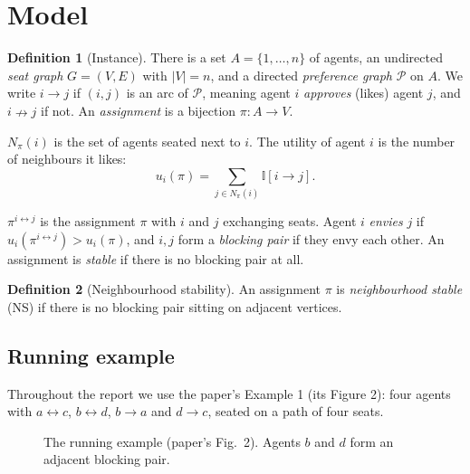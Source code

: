 \documentclass[11pt,a4paper]{article}
\theoremstyle{definition}
\newtheorem{definition}{Definition}
\theoremstyle{remark}
\theoremstyle{plain}
\newcommand{\nlikes}{\nrightarrow}
\newcommand{\cP}{\mathcal{P}}
\newcommand{\figtwopref}{%
  \node[aga] (a) at (0,1.6) {a}; \node[agc] (c) at (2.1,1.6) {c};
  \node[agb] (b) at (0,0) {b};   \node[agd] (d) at (2.1,0) {d};
  \draw[arc] (a) to[bend left=18] (c); \draw[arc] (c) to[bend left=18] (a);
  \draw[arc] (b) to[bend left=18] (d); \draw[arc] (d) to[bend left=18] (b);
  \draw[arc] (b) -- (a); \draw[arc] (d) -- (c);}
\newcommand{\pathseat}[4]{%
  \draw[sedge] (0,0) -- (4.5,0);
  \node[ag#1] (#1) at (0,0) {#1}; \node[ag#2] (#2) at (1.5,0) {#2};
  \node[ag#3] (#3) at (3,0) {#3}; \node[ag#4] (#4) at (4.5,0) {#4};}
\newcommand{\seatlabels}{\foreach \i in {1,...,4}{\node[lab] at ({(\i-1)*1.5},-0.6) {$v_{\i}$};}}
\begin{document}
\section{Model}

\begin{definition}[Instance]
There is a set $A=\{1,\dots,n\}$ of agents, an undirected \emph{seat graph} $G=(V,E)$ with $|V|=n$, and a directed \emph{preference graph} $\cP$ on $A$. We write $i\to j$ if $(i,j)$ is an arc of $\cP$, meaning agent $i$ \emph{approves} (likes) agent $j$, and $i\nlikes j$ if not. An \emph{assignment} is a bijection $\pi:A\to V$.
\end{definition}

$N_\pi(i)$ is the set of agents seated next to $i$. The utility of agent $i$ is the number of neighbours it likes:
\[ u_i(\pi)=\sum_{j\in N_\pi(i)}\mathbb{I}[i\to j]. \]

$\pi^{i\leftrightarrow j}$ is the assignment $\pi$ with $i$ and $j$ exchanging seats. Agent $i$ \emph{envies} $j$ if $u_i(\pi^{i\leftrightarrow j})>u_i(\pi)$, and $i,j$ form a \emph{blocking pair} if they envy each other. An assignment is \emph{stable} if there is no blocking pair at all.

\begin{definition}[Neighbourhood stability]
An assignment $\pi$ is \emph{neighbourhood stable} (NS) if there is no blocking pair sitting on adjacent vertices.
\end{definition}


\subsection{Running example}

Throughout the report we use the paper's Example 1 (its Figure 2): four agents with $a\leftrightarrow c$, $b\leftrightarrow d$, $b\to a$ and $d\to c$, seated on a path of four seats.

\begin{figure}[h]
\centering
{}
\caption{The running example (paper's Fig.~2). Agents $b$ and $d$ form an adjacent blocking pair.}
\label{fig:running}
\end{figure}
\end{document}

